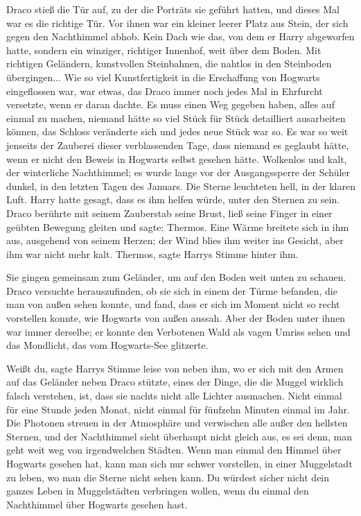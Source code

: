 Draco stieß die Tür auf, zu der die Porträts sie geführt hatten, und dieses Mal
war es die richtige Tür. Vor ihnen war ein kleiner leerer Platz aus Stein, der
sich gegen den Nachthimmel abhob. Kein Dach wie das, von dem er Harry abgeworfen
hatte, sondern ein winziger, richtiger Innenhof, weit über dem Boden. Mit
richtigen Geländern, kunstvollen Steinbahnen, die nahtlos in den Steinboden
übergingen... Wie so viel Kunstfertigkeit in die Erschaffung von Hogwarts
eingeflossen war, war etwas, das Draco immer noch jedes Mal in Ehrfurcht
versetzte, wenn er daran dachte. Es muss einen Weg gegeben haben, alles auf
einmal zu machen, niemand hätte so viel Stück für Stück detailliert ausarbeiten
können, das Schloss veränderte sich und jedes neue Stück war so. Es war so weit
jenseits der Zauberei dieser verblassenden Tage, dass niemand es geglaubt hätte,
wenn er nicht den Beweis in Hogwarts selbst gesehen hätte. Wolkenlos und kalt,
der winterliche Nachthimmel; es wurde lange vor der Ausgangssperre der Schüler
dunkel, in den letzten Tagen des Januars. Die Sterne leuchteten hell, in der
klaren Luft. Harry hatte gesagt, dass es ihm helfen würde, unter den Sternen zu
sein. Draco berührte mit seinem Zauberstab seine Brust, ließ seine Finger in
einer geübten Bewegung gleiten und sagte: \glqq Thermos.\grqq{} Eine Wärme
breitete sich in ihm aus, ausgehend von seinem Herzen; der Wind blies ihm weiter
ins Gesicht, aber ihm war nicht mehr kalt. \glqq Thermos\grqq{}, sagte Harrys
Stimme hinter ihm.

Sie gingen gemeinsam zum Geländer, um auf den Boden weit unten zu schauen. Draco
versuchte herauszufinden, ob sie sich in einem der Türme befanden, die man von
außen sehen konnte, und fand, dass er sich im Moment nicht so recht vorstellen
konnte, wie Hogwarts von außen aussah. Aber der Boden unter ihnen war immer
derselbe; er konnte den Verbotenen Wald als vagen Umriss sehen und das
Mondlicht, das vom Hogwarts-See glitzerte.

\glqq Weißt du\grqq{}, sagte Harrys Stimme leise von neben ihm, wo er sich mit
den Armen auf das Geländer neben Draco stützte, \glqq eines der Dinge, die die
Muggel wirklich falsch verstehen, ist, dass sie nachts nicht alle Lichter
ausmachen. Nicht einmal für eine Stunde jeden Monat, nicht einmal für fünfzehn
Minuten einmal im Jahr. Die Photonen streuen in der Atmosphäre und verwischen
alle außer den hellsten Sternen, und der Nachthimmel sieht überhaupt nicht
gleich aus, es sei denn, man geht weit weg von irgendwelchen Städten. Wenn man
einmal den Himmel über Hogwarts gesehen hat, kann man sich nur schwer
vorstellen, in einer Muggelstadt zu leben, wo man die Sterne nicht sehen kann.
Du würdest sicher nicht dein ganzes Leben in Muggelstädten verbringen wollen,
wenn du einmal den Nachthimmel über Hogwarts gesehen hast.\grqq{}

